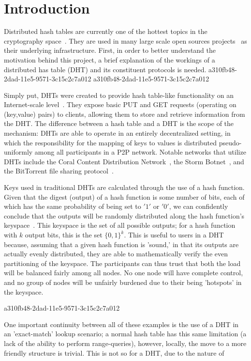 \documentclass[12pt]{article}
\begin{document}
\section{Introduction}
\par Distributed hash tables are currently one of the hottest topics in the cryptography space~\cite{Stoica:2001dj,Rowstron:2001ea,Ratnasamy:2001wn}. They are used in many large scale open sources projects~\cite{Freitas:2013tb,Xu:2010vs,Perfitt:2010fh} as their underlying infrastructure. First, in order to better understand the motivation behind this project, a brief explanation of the workings of a distributed has table (DHT) and its constituent protocols is needed.
a310fb48-2dad-11e5-9571-3c15c2c7a012
a310fb48-2dad-11e5-9571-3c15c2c7a012\par Simply put, DHTs were created to provide hash table-like functionality on an Internet-scale level~\cite{Ratnasamy:2001wn}. They expose basic PUT and GET requests (operating on (key,value) pairs) to clients, allowing them to store and retrieve information from the DHT. The difference between a hash table and a DHT is the scope of the mechanism: DHTs are able to operate in an entirely decentralized setting, in which the responsibility for the mapping of keys to values is distributed pseudo-uniformly among all participants in a P2P network. Notable networks that utilize DHTs include the Coral Content Distribution Network~\cite{Freedman:2004vb}, the Storm Botnet~\cite{Holz:2008uk}, and the BitTorrent file sharing protocol~\cite{Cohen:y1_8mBnw}.

\par Keys used in traditional DHTs are calculated through the use of a hash function. Given that the digest (output) of a hash function is some number of bits, each of which has the same probability of being set to $'1'$ or $'0'$, we can confidently conclude that the outputs will be randomly distributed along the hash function's keyspace~. This keyspace is the set of all possible outputs; for a hash function with $k$ output bits, this is the set $\{0,1\}^k$. This is useful to users in a DHT because, assuming that a given hash function is 'sound,' in that its outputs are actually evenly distributed, they are able to mathematically verify the even partitioning of the keyspace. The participants can thus trust that both the load will be balanced fairly among all nodes. No one node will have complete control, and no group of nodes will be unfairly burdened due to their being 'hotspots' in the keyspace.~

a310fb48-2dad-11e5-9571-3c15c2c7a012\par One important continuity between all of these examples is the use of a DHT in an 'exact-match' lookup scenario; a normal hash table has this same limitation (a lack of the ability to perform range-queries), however, locally, the move to a more friendly structure is trivial. This is not so for a DHT, due to the nature of
\printbibliography
\end{document}

